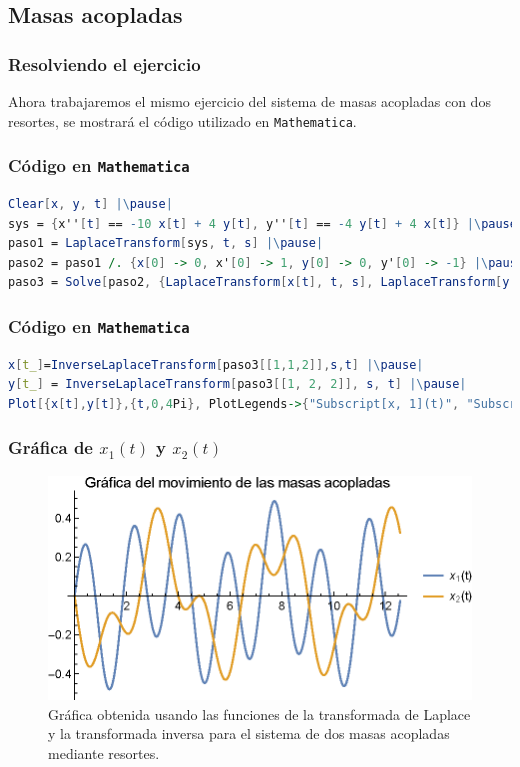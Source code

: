 \subsection{Masas acopladas}
\begin{frame}
\frametitle{Resolviendo el ejercicio}
Ahora trabajaremos el mismo ejercicio del sistema de masas acopladas con dos resortes, se mostrará el código utilizado en \texttt{Mathematica}.
\end{frame}
\begin{frame}[fragile]
\frametitle{Código en \texttt{Mathematica}}
\begin{lstlisting}[language=Mathematica]
Clear[x, y, t] |\pause|
sys = {x''[t] == -10 x[t] + 4 y[t], y''[t] == -4 y[t] + 4 x[t]} |\pause|
paso1 = LaplaceTransform[sys, t, s] |\pause|
paso2 = paso1 /. {x[0] -> 0, x'[0] -> 1, y[0] -> 0, y'[0] -> -1} |\pause|
paso3 = Solve[paso2, {LaplaceTransform[x[t], t, s], LaplaceTransform[y[t], t, s]}] // Simplify
\end{lstlisting}    
\end{frame}
\begin{frame}[fragile]
\frametitle{Código en \texttt{Mathematica}}
\begin{lstlisting}[language=Mathematica]
x[t_]=InverseLaplaceTransform[paso3[[1,1,2]],s,t] |\pause|
y[t_] = InverseLaplaceTransform[paso3[[1, 2, 2]], s, t] |\pause|
Plot[{x[t],y[t]},{t,0,4Pi}, PlotLegends->{"Subscript[x, 1](t)", "Subscript[x, 2](t)"}, PlotLabel->"Grafica del movimiento de las masas acopladas", LabelStyle->Directive[FontSize->12]]
\end{lstlisting}    
\end{frame}
\begin{frame}
\frametitle{Gráfica de $x_{1}(t)$ y $x_{2}(t)$}
\begin{figure}[H]
    \centering
    \includegraphics[scale=0.95]{Imagenes/Ejercicio_masas_acopladas_01.eps}
    \caption{Gráfica obtenida usando las funciones de la transformada de Laplace y la transformada inversa para el sistema de dos masas acopladas mediante resortes.}
\end{figure}
\end{frame}
